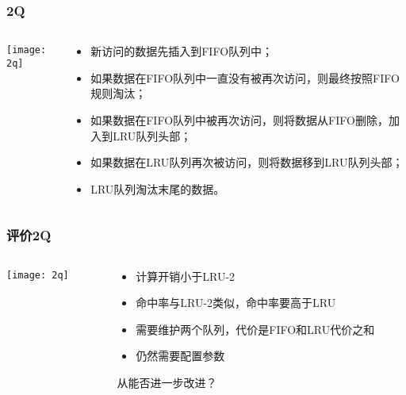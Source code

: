 \begin{frame}[plain]
	\frametitle{2Q}
	\begin{columns}
		\begin{column}{.4\textwidth}
			\centering
			\texttt{[image: 2q]}
		\end{column}
		
		\begin{column}{.6\textwidth}
			
				\begin{itemize}
					
					\item 新访问的数据先插入到FIFO队列中；
					\item 如果数据在FIFO队列中一直没有被再次访问，则最终按照FIFO规则淘汰；
					\item 如果数据在FIFO队列中被再次访问，则将数据从FIFO删除，加入到LRU队列头部；
					\item 如果数据在LRU队列再次被访问，则将数据移到LRU队列头部；
					\item LRU队列淘汰末尾的数据。
				\end{itemize}

		\end{column}
		
		
	\end{columns}
\end{frame}



\begin{frame}[plain]
	\frametitle{评价2Q}
	\begin{columns}
		\begin{column}{.4\textwidth}
			\centering
			\texttt{[image: 2q]}
		\end{column}
		
		\begin{column}{.6\textwidth}
			
				\begin{itemize}
					\item 计算开销小于LRU-2
					\item 命中率与LRU-2类似，命中率要高于LRU
					\item 需要维护两个队列，代价是FIFO和LRU代价之和
					\item 仍然需要配置参数

				\end{itemize}
						\centering
						\large 从能否进一步改进？
												
		\end{column}
		
		
	\end{columns}
\end{frame}




